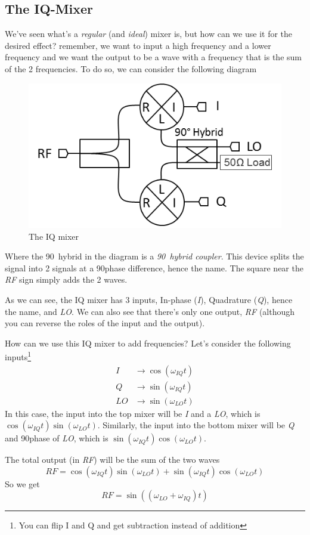\subsection{The IQ-Mixer}
We've seen what's a \textit{regular} (and \textit{ideal}) mixer is, but how can we use it for the desired effect? remember, we want to input a high frequency and a lower frequency and we want the output to be a wave with a frequency that is the sum of the 2 frequencies. To do so, we can consider the following diagram
\begin{figure}[H]
    \centering
    \includegraphics[width=0.5\columnwidth]{gfx/IQ-Mixer.png}
    \caption{The IQ mixer}
    \label{fig:IQ-Mixer}
\end{figure}
Where the 90\degree\ hybrid in the diagram is a \textit{90\degree\  hybrid coupler}. This device splits the signal into 2 signals at a 90\degree phase difference, hence the name. The square near the \textit{RF} sign simply adds the 2 waves.

As we can see, the IQ mixer has 3 inputs, In-phase (\textit{I}), Quadrature (\textit{Q}), hence the name, and \textit{LO}. We can also see that there's only one output, \textit{RF} (although you can reverse the roles of the input and the output).

How can we use this IQ mixer to add frequencies? Let's consider the following inputs\footnote{You can flip I and Q and get subtraction instead of addition}
\begin{align*}
    I &\longrightarrow \cos (\omega_{IQ} t)\\
    Q &\longrightarrow \sin (\omega_{IQ} t)\\
    LO &\longrightarrow \sin (\omega_{LO}t)
\end{align*}
In this case, the input into the top mixer will be \textit{I} and a \textit{LO}, which is $\cos (\omega_{IQ}t)\sin (\omega_{LO}t)$. Similarly, the input into the bottom mixer will be \textit{Q} and 90\degree phase of \textit{LO}, which is $\sin (\omega_{IQ}t)\cos (\omega_{LO}t)$.

The total output (in \textit{RF}) will be the sum of the two waves
$$RF = \cos (\omega_{IQ}t)\sin (\omega_{LO}t) + \sin (\omega_{IQ}t)\cos (\omega_{LO}t)$$
So we get
\begin{equation}
    \boxed{RF = \sin ( (\omega_{LO} + \omega_{IQ})t)}
\end{equation}

